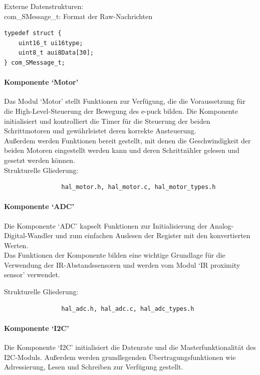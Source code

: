 \documentclass[10pt,a4paper]{article}
\begin{document}
				Externe Datenstrukturen: \\
				com\_SMessage\_t: Format der Raw-Nachrichten
				
				\lstset{language = C, tabsize = 4}
				\begin{lstlisting}[frame = single]
typedef struct {
	uint16_t ui16type;
	uint8_t aui8Data[30];
} com_SMessage_t;
				\end{lstlisting}
				
			\paragraph*{Komponente `Motor'}
			Das Modul `Motor' stellt Funktionen zur Verfügung, die die Voraussetzung für die High-Level-Steuerung der Bewegung des e-puck bilden.
			Die Komponente initialisiert und kontrolliert die Timer für die Steuerung der beiden Schrittmotoren und gewährleistet deren korrekte
			Ansteuerung. \\
			Außerdem werden Funktionen bereit gestellt, mit denen die Geschwindigkeit der beiden Motoren eingestellt werden kann und deren
			Schrittzähler gelesen und gesetzt werden können. \\
			
			Strukturelle Gliederung:
				\begin{verbatim}  
				hal_motor.h, hal_motor.c, hal_motor_types.h
				\end{verbatim}
						
			\paragraph*{Komponente `ADC'}
			Die Komponente `ADC' kapselt Funktionen zur Initialisierung der Analog-Digital-Wandler und zum einfachen Auslesen der Register
			mit den konvertierten Werten. \\
			Das Funktionen der Komponente bilden eine wichtige Grundlage für die Verwendung der IR-Abstandssensoren und werden vom Modul `IR 
			proximity sensor' verwendet.
			
			Strukturelle Gliederung:
				\begin{verbatim}  
				hal_adc.h, hal_adc.c, hal_adc_types.h
				\end{verbatim}
			
			\paragraph*{Komponente `I2C'}
			Die Komponente `I2C' initialisiert die Datenrate und die Masterfunktionalität des I2C-Moduls.
			Außerdem werden grundlegenden Übertragungsfunktionen wie Adressierung, Lesen und Schreiben zur Verfügung gestellt. \\
			
\end{document}
